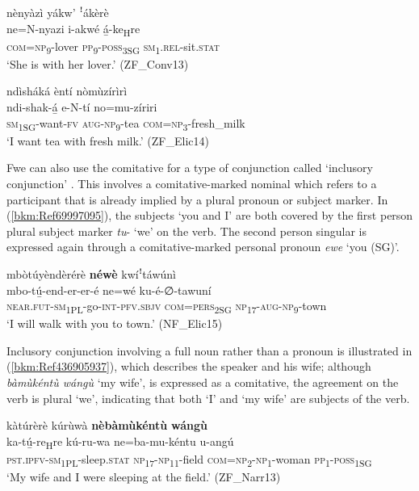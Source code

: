 \ea
nènyàzì yákw’ ꜝákèrè\\
\gll ne=N-nyazi    i-akwé  á̲-ke\textsubscript{H}re\\
\textsc{com}=\textsc{np}\textsubscript{9}-lover  \textsc{pp}\-\textsubscript{9}-\textsc{poss}\textsubscript{3SG}  \textsc{sm}\textsubscript{1}.\textsc{rel}-sit.\textsc{stat}\\
\glt ‘She is with her lover.’ (ZF\_Conv13)
\z

\ea
\label{bkm:Ref99022299}
ndìsháká èntí nòmùzírìrì\\
\gll ndi-shak-á̲    e-N-tí    no=mu-zíriri\\
\textsc{sm}\textsubscript{1SG}-want-\textsc{fv}  \textsc{aug}-\textsc{np}\textsubscript{9}-tea  \textsc{com}=\textsc{np}\textsubscript{3}-fresh\_milk\\
\glt ‘I want tea with fresh milk.’ (ZF\_Elic14)
\z

Fwe can also use the comitative for a type of conjunction called ‘inclusory conjunction’ \citep{Haspelmath2007}. This involves a comitative-marked nominal which refers to a participant that is already implied by a plural pronoun or subject marker. In (\ref{bkm:Ref69997095}), the subjects ‘you and I’ are both covered by the first person plural subject marker \textit{tu}\nobreakdash- ‘we’ on the verb. The second person singular is expressed again through a comitative-marked personal pronoun \textit{ewe} ‘you (SG)’.

\ea
\label{bkm:Ref436905818}
\label{bkm:Ref69997095}
mbòtúyèndèrérè \textbf{néwè} kwíꜝtáwúnì\\
\gll mbo-tú̲-end-er-er-é      ne=wé    ku-é-∅-tawuní\\
\textsc{near}.\textsc{fut}-\textsc{sm}\textsubscript{1PL}-go-\textsc{int}-\textsc{pfv}.\textsc{sbjv}  \textsc{com}=\textsc{pers}\textsubscript{2SG}  \textsc{np}\textsubscript{17}-\textsc{aug}-\textsc{np}\textsubscript{9}-town\\
\glt ‘I will walk with you to town.’ (NF\_Elic15)
\z

Inclusory conjunction involving a full noun rather than a pronoun is illustrated in (\ref{bkm:Ref436905937}), which describes the speaker and his wife; although \textit{bàmùkéntù wángù} ‘my wife’, is expressed as a comitative, the agreement on the verb is plural ‘we’, indicating that both ‘I’ and ‘my wife’ are subjects of the verb.

\ea
\label{bkm:Ref436905937}
\label{bkm:Ref437356554}
kàtúrèrè kúrùwà \textbf{nèbàmùkéntù} \textbf{wángù}\\
\gll ka-tú̲-re\textsubscript{H}re      kú-ru-wa ne=ba-mu-kéntu    u-angú \\
\textsc{pst}.\textsc{ipfv}-\textsc{sm}\textsubscript{1PL}-sleep.\textsc{stat}  \textsc{np}\textsubscript{17}-\textsc{np}\textsubscript{11}-field
\textsc{com}=\textsc{np}\textsubscript{2}-\textsc{np}\textsubscript{1}-woman  \textsc{pp}\textsubscript{1}-\textsc{poss}\textsubscript{1SG}\\
\glt ‘My wife and I were sleeping at the field.’ (ZF\_Narr13)
\z

